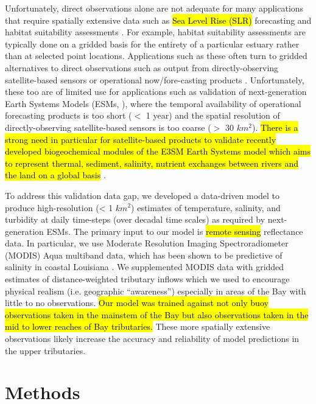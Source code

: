 \documentclass{article}
\begin{document}
Unfortunately, direct observations alone are not adequate for many applications that require spatially extensive data such as \hl{Sea Level Rise (SLR)} forecasting and habitat suitability assessments \cite{hoodChesapeakeBayProgram2021}. For example, habitat suitability assessments are typically done on a gridded basis for the entirety of a particular estuary rather than at selected point locations. Applications such as these often turn to gridded alternatives to direct observations such as output from directly-observing satellite-based sensors \cite{foreCombinedActivePassive2016} or operational now/fore-casting products \cite{lanerolle2011second}. Unfortunately, these too are of limited use for applications such as validation of next-generation Earth Systems Models (ESMs, \cite{golazDOEE3SMModel2022, xuDevelopmentLandRiver2022a}), where the temporal availability of operational forecasting products is too short ($<$ 1 year) and the spatial resolution of directly-observing satellite-based sensors is too coarse ($>$ 30 $km^2$). \hl{There is a strong need in particular for satellite-based products to validate recently developed biogeochemical modules of the E3SM Earth Systems model which aims to represent thermal, sediment, salinity, nutrient exchanges between rivers and the land on a global basis} \cite{xuDevelopmentLandRiver2022a}.

To address this validation data gap, we developed a data-driven model to produce high-resolution (< 1 $km^2$) estimates of temperature, salinity, and turbidity at daily time-steps (over decadal time scales) as required by next-generation ESMs. The primary input to our model is \hl{remote sensing} reflectance data. In particular, we use Moderate Resolution Imaging Spectroradiometer (MODIS) Aqua multiband data, which has been shown to be predictive of salinity in coastal Louisiana \cite{vogelAssessingSatelliteSea2016, wangDevelopmentMODISData2018}. We supplemented MODIS data with gridded estimates of distance-weighted tributary inflows which we used to encourage physical realism (i.e. geographic “awareness”) especially in areas of the Bay with little to no observations. \hl{Our model was trained against not only buoy observations taken in the mainstem of the Bay but also observations taken in the mid to lower reaches of Bay tributaries.} These more spatially extensive observations likely increase the accuracy and reliability of model predictions in the upper tributaries.


\section{Methods}
\end{document}

